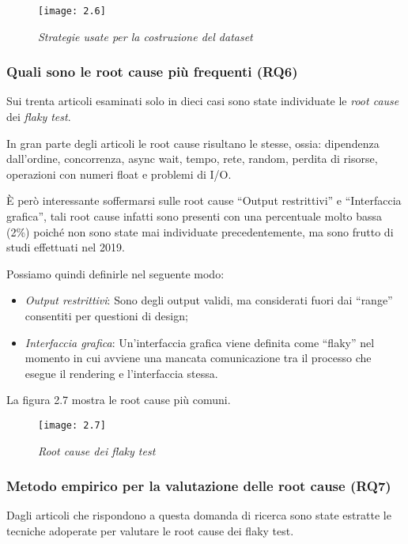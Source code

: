 \begin{figure}[h]
	\centering
	\texttt{[image: 2.6]}
	\caption{\emph{Strategie usate per la costruzione del dataset}}
	\label{fig:mesh1}
\end{figure}
\subsubsection{Quali sono le root cause più frequenti (RQ6)}
Sui trenta articoli esaminati solo in dieci casi sono state individuate le \emph{root cause} dei \emph{flaky test}.

In gran parte degli articoli le root cause risultano le stesse,
ossia: dipendenza dall’ordine, concorrenza, async wait, tempo, rete, random,
perdita di risorse, operazioni con numeri float e problemi di I/O.

È però interessante soffermarsi sulle root cause “Output restrittivi” e “Interfaccia grafica”, tali root
cause infatti sono presenti con una percentuale molto bassa (2\%) poiché non sono state mai individuate precedentemente, ma sono frutto di studi effettuati nel 2019. 

Possiamo quindi definirle nel seguente modo:
\begin{itemize}
	\item \emph{Output restrittivi}: Sono degli output validi, ma considerati fuori dai “range” consentiti per questioni di design;
	\item \emph{Interfaccia grafica}: Un’interfaccia grafica viene definita come “flaky” nel momento in cui avviene una mancata comunicazione tra il processo che esegue il rendering e l’interfaccia stessa.
\end{itemize}

La figura 2.7 mostra le root cause più comuni.
\newpage
\begin{figure}[h]
	\centering
	\texttt{[image: 2.7]}
	\caption{\emph{Root cause dei flaky test}}
	\label{fig:mesh1}
\end{figure}
\subsubsection{Metodo empirico per la valutazione delle root cause (RQ7)}
Dagli articoli che rispondono a questa domanda di ricerca sono state estratte le tecniche adoperate per valutare le root cause dei flaky test.

